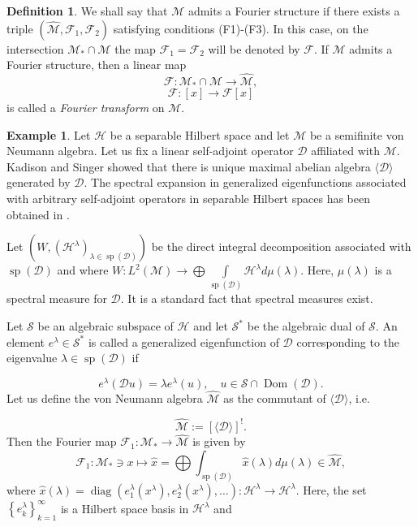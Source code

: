 \documentclass[a4paper,12pt]{amsart}
\numberwithin{equation}{section}
\theoremstyle{definition}
\newtheorem{defn}[thm]{Definition}
\newtheorem{ex}[thm]{Example}
\begin{document}
\begin{defn}\label{Fourier-transform}We shall say that $\mathcal{M}$ admits a Fourier structure if there exists a triple $\left(\widehat{\mathcal{M}}, \mathcal{F}_{1}, \mathcal{F}_{2}\right)$ satisfying conditions (F1)-(F3). In this case, on the intersection $\mathcal{M}_{*} \cap \mathcal{M}$ the map $\mathcal{F}_1=\mathcal{F}_{2}$ will be denoted by $\mathcal{F}.$
If $\mathcal{M}$ admits a Fourier structure, then a linear map 
$$\mathcal{F}: \mathcal{M}_{*} \cap \mathcal{M} \rightarrow \widehat{\mathcal{M}}, $$
$$\mathcal{F}:[x]\to \mathcal{F}[x]$$
is called a {\it Fourier transform} on $\mathcal{M}.$
\end{defn}


\begin{ex} Let $\mathcal{H}$ be a separable Hilbert space and let  $\mathcal{M}$ be a semifinite von Neumann algebra. Let us fix a linear self-adjoint operator $\mathcal{D}$ affiliated with $\mathcal{M}$. Kadison and Singer showed that there is unique maximal abelian algebra $\langle\mathcal{D}\rangle$ generated by $\mathcal{D}$. The spectral expansion in generalized eigenfunctions associated with arbitrary self-adjoint operators in separable Hilbert spaces has been obtained in \cite{LT16}.

Let $\left(W,\left(\mathcal{H}^{\lambda}\right)_{\lambda \in \operatorname{sp}(\mathcal{D})}\right)$ be the direct integral decomposition associated with $\operatorname{sp}(\mathcal{D})$ and where $W: L^{2}(\mathcal{M}) \rightarrow \bigoplus \int\limits_{\operatorname{sp}(\mathcal{D})} \mathcal{H}^{\lambda} d \mu(\lambda)$. Here, $\mu(\lambda)$ is a spectral measure for $\mathcal{D}$. It is a standard fact that spectral measures exist.

Let $\mathcal{S}$ be an algebraic subspace of $\mathcal{H}$ and let $\mathcal{S}^{*}$ be the algebraic dual of $\mathcal{S}$. An element $e^{\lambda} \in \mathcal{S}^{*}$ is called a generalized eigenfunction of $\mathcal{D}$ corresponding to the eigenvalue $\lambda \in \operatorname{sp}(\mathcal{D})$ if

$$
e^{\lambda}(\mathcal{D} u)=\lambda e^{\lambda}(u), \quad u \in \mathcal{S} \cap \operatorname{Dom}(\mathcal{D}).
$$
Let us define the von Neumann algebra $\widehat{\mathcal{M}}$ as the commutant of $\langle\mathcal{D}\rangle$, i.e.


\begin{equation}\label{2.8}
\widehat{\mathcal{M}}:=[\langle\mathcal{D}\rangle]^{!}. 
\end{equation}
Then the Fourier map $\mathcal{F}_{1}: \mathcal{M}_{*} \rightarrow \widehat{\mathcal{M}}$ is given by
$$
\mathcal{F}_{1}: \mathcal{M}_{*} \ni x \mapsto \widehat{x}=\bigoplus \int_{\operatorname{sp}(\mathcal{D})} \widehat{x}(\lambda) d \mu(\lambda) \in \widehat{\mathcal{M}},
$$
where $\widehat{x}(\lambda)=\operatorname{diag}\left(e_{1}^{\lambda}\left(x^{\lambda}\right), e_{2}^{\lambda}\left(x^{\lambda}\right),\ldots\right): \mathcal{H}^{\lambda} \rightarrow \mathcal{H}^{\lambda}$. Here, the set $\left\{e_{k}^{\lambda}\right\}_{k=1}^{\infty}$ is a Hilbert space basis in $\mathcal{H}^{\lambda}$ and



\end{ex}
\end{document}
